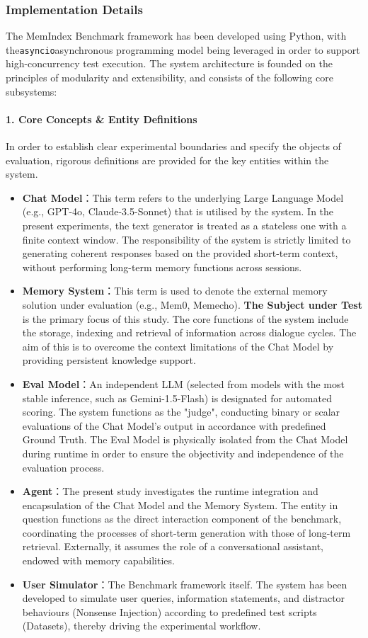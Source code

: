 \subsubsection{Implementation Details}

The MemIndex Benchmark framework has been developed using Python, with the\texttt{asyncio}asynchronous programming model being leveraged in order to support high-concurrency test execution. The system architecture is founded on the principles of modularity and extensibility, and consists of the following core subsystems:

\paragraph{1. Core Concepts \& Entity Definitions}
In order to establish clear experimental boundaries and specify the objects of evaluation, rigorous definitions are provided for the key entities within the system.

\begin{itemize}
\item \textbf{Chat Model}：This term refers to the underlying Large Language Model (e.g., GPT-4o, Claude-3.5-Sonnet) that is utilised by the system. In the present experiments, the text generator is treated as a stateless one with a finite context window. The responsibility of the system is strictly limited to generating coherent responses based on the provided short-term context, without performing long-term memory functions across sessions.
\item \textbf{Memory System}：This term is used to denote the external memory solution under evaluation (e.g., Mem0, Memecho). \textbf{The Subject under Test} is the primary focus of this study. The core functions of the system include the storage, indexing and retrieval of information across dialogue cycles. The aim of this is to overcome the context limitations of the Chat Model by providing persistent knowledge support.
\item \textbf{Eval Model}：An independent LLM (selected from models with the most stable inference, such as Gemini-1.5-Flash) is designated for automated scoring. The system functions as the "judge", conducting binary or scalar evaluations of the Chat Model's output in accordance with predefined Ground Truth. The Eval Model is physically isolated from the Chat Model during runtime in order to ensure the objectivity and independence of the evaluation process.
\item \textbf{Agent}：The present study investigates the runtime integration and encapsulation of the Chat Model and the Memory System. The entity in question functions as the direct interaction component of the benchmark, coordinating the processes of short-term generation with those of long-term retrieval. Externally, it assumes the role of a conversational assistant, endowed with memory capabilities.
\item \textbf{User Simulator}：The Benchmark framework itself. The system has been developed to simulate user queries, information statements, and distractor behaviours (Nonsense Injection) according to predefined test scripts (Datasets), thereby driving the experimental workflow.
\end{itemize}

